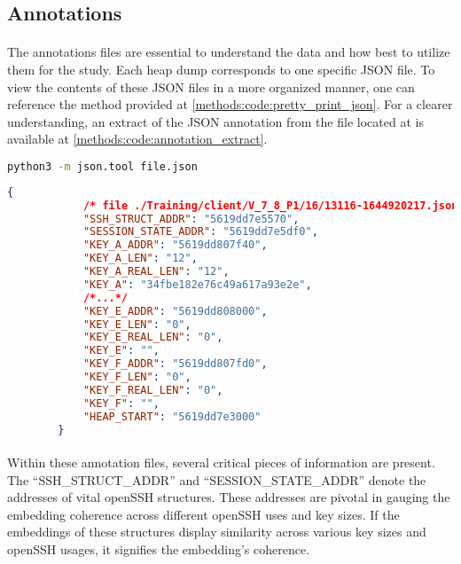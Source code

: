     \subsection*{Annotations}
        \paragraph{}The annotations files are essential to understand the data and how best to utilize them for the study. Each heap dump corresponds to one specific JSON file. To view the contents of these JSON files in a more organized manner, one can reference the method provided at \ref{methods:code:pretty_print_json}. For a clearer understanding, an extract of the JSON annotation from the file located at  is available at \ref{methods:code:annotation_extract}.

        \begin{lstlisting}[caption={pretty print JSON}, label=methods:code:pretty_print_json, language=bash]
            python3 -m json.tool file.json
        \end{lstlisting}
        \begin{lstlisting}[language=json, caption={An extract of the JSON annotations}, label=methods:code:annotation_extract]
        {
            /* file ./Training/client/V_7_8_P1/16/13116-1644920217.json*/
            "SSH_STRUCT_ADDR": "5619dd7e5570",
            "SESSION_STATE_ADDR": "5619dd7e5df0",
            "KEY_A_ADDR": "5619dd807f40",
            "KEY_A_LEN": "12",
            "KEY_A_REAL_LEN": "12",
            "KEY_A": "34fbe182e76c49a617a93e2e",
            /*...*/
            "KEY_E_ADDR": "5619dd808000",
            "KEY_E_LEN": "0",
            "KEY_E_REAL_LEN": "0",
            "KEY_E": "",
            "KEY_F_ADDR": "5619dd807fd0",
            "KEY_F_LEN": "0",
            "KEY_F_REAL_LEN": "0",
            "KEY_F": "",
            "HEAP_START": "5619dd7e3000"
        }
        \end{lstlisting}

        \paragraph{}Within these annotation files, several critical pieces of information are present. The ``SSH\_STRUCT\_ADDR'' and ``SESSION\_STATE\_ADDR'' denote the addresses of vital openSSH \glspl{structure}. These addresses are pivotal in gauging the embedding coherence across different openSSH uses and key sizes. If the embeddings of these \glspl{structure} display similarity across various key sizes and openSSH usages, it signifies the embedding's coherence.

